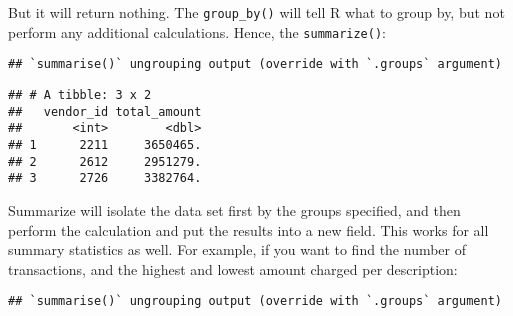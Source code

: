 \documentclass[
]{book}
\newenvironment{Shaded}{\begin{snugshade}}{\end{snugshade}}
\newcommand{\DataTypeTok}[1]{\textcolor[rgb]{0.13,0.29,0.53}{#1}}
\newcommand{\KeywordTok}[1]{\textcolor[rgb]{0.13,0.29,0.53}{\textbf{#1}}}
\newcommand{\NormalTok}[1]{#1}
\newcommand{\OperatorTok}[1]{\textcolor[rgb]{0.81,0.36,0.00}{\textbf{#1}}}
\newcommand{\StringTok}[1]{\textcolor[rgb]{0.31,0.60,0.02}{#1}}
\begin{document}
But it will return nothing. The \texttt{group\_by()} will tell R what to group by, but not perform any additional calculations. Hence, the \texttt{summarize()}:

\begin{Shaded}
\end{Shaded}

\begin{verbatim}
## `summarise()` ungrouping output (override with `.groups` argument)
\end{verbatim}

\begin{verbatim}
## # A tibble: 3 x 2
##   vendor_id total_amount
##       <int>        <dbl>
## 1      2211     3650465.
## 2      2612     2951279.
## 3      2726     3382764.
\end{verbatim}

Summarize will isolate the data set first by the groups specified, and then perform the calculation and put the results into a new field. This works for all summary statistics as well. For example, if you want to find the number of transactions, and the highest and lowest amount charged per description:

\begin{Shaded}
\end{Shaded}

\begin{verbatim}
## `summarise()` ungrouping output (override with `.groups` argument)
\end{verbatim}
\end{document}
